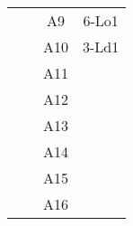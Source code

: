 \begin{longtable}[c]{cccc}
\multicolumn{1}{|c|}{}                                    & \multicolumn{1}{c|}{}                                                                                                                          & \multicolumn{1}{c|}{\cellcolor[HTML]{80EDF3}A9}    & \multicolumn{1}{c|}{6-Lo1}                               \\ \cline{3-4} 
\multicolumn{1}{|c|}{}                                    & \multicolumn{1}{c|}{}                                                                                                                          & \multicolumn{1}{c|}{\cellcolor[HTML]{34CDF9}A10}   & \multicolumn{1}{c|}{3-Ld1}                               \\ \cline{3-4} 
\multicolumn{1}{|c|}{}                                    & \multicolumn{1}{c|}{}                                                                                                                          & \multicolumn{1}{c|}{\cellcolor[HTML]{80EDF3}A11}   & \multicolumn{1}{c|}{}                                    \\ \cline{3-4} 
\multicolumn{1}{|c|}{}                                    & \multicolumn{1}{c|}{}                                                                                                                          & \multicolumn{1}{c|}{\cellcolor[HTML]{34CDF9}A12}   & \multicolumn{1}{c|}{}                                    \\ \cline{3-4} 
\multicolumn{1}{|c|}{}                                    & \multicolumn{1}{c|}{}                                                                                                                          & \multicolumn{1}{c|}{\cellcolor[HTML]{80EDF3}A13}   & \multicolumn{1}{c|}{}                                    \\ \cline{3-4} 
\multicolumn{1}{|c|}{}                                    & \multicolumn{1}{c|}{}                                                                                                                          & \multicolumn{1}{c|}{\cellcolor[HTML]{34CDF9}A14}   & \multicolumn{1}{c|}{}                                    \\ \cline{3-4} 
\multicolumn{1}{|c|}{}                                    & \multicolumn{1}{c|}{}                                                                                                                          & \multicolumn{1}{c|}{\cellcolor[HTML]{80EDF3}A15}   & \multicolumn{1}{c|}{}                                    \\ \cline{3-4} 
\multicolumn{1}{|c|}{}                                    & \multicolumn{1}{c|}{}                                                                                                                          & \multicolumn{1}{c|}{\cellcolor[HTML]{34CDF9}A16}   & \multicolumn{1}{c|}{}                                    \\ \cline{3-4} 

\end{longtable}
